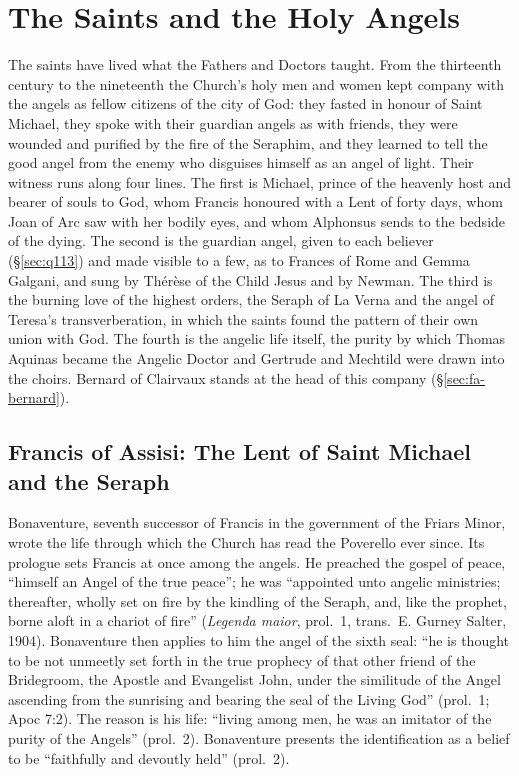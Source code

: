\section{The Saints and the Holy Angels}\label{sec:saints}

The saints have lived what the Fathers and Doctors taught. From the
thirteenth century to the nineteenth the Church's holy men and women kept
company with the angels as fellow citizens of the city of God: they fasted
in honour of Saint Michael, they spoke with their guardian angels as with
friends, they were wounded and purified by the fire of the Seraphim, and
they learned to tell the good angel from the enemy who disguises himself as
an angel of light. Their witness runs along four lines. The first is
Michael, prince of the heavenly host and bearer of souls to God, whom
Francis honoured with a Lent of forty days, whom Joan of Arc saw with her
bodily eyes, and whom Alphonsus sends to the bedside of the dying. The
second is the guardian angel, given to each believer
(\S\ref{sec:q113}) and made visible to a few, as to Frances of Rome and Gemma Galgani, and sung by Thérèse of the
Child Jesus and by Newman. The third is the burning love of the highest
orders, the Seraph of La Verna and the angel of Teresa's transverberation,
in which the saints found the pattern of their own union with God. The
fourth is the angelic life itself, the purity by which Thomas Aquinas became
the Angelic Doctor and Gertrude and Mechtild were drawn into the choirs.
Bernard of Clairvaux stands at the head of this company
(\S\ref{sec:fa-bernard}).

\sectionguard\subsection{Francis of Assisi: The Lent of Saint Michael and
the Seraph}\label{sec:sa-francis}

Bonaventure, seventh successor of Francis in the government of the Friars
Minor, wrote the life through which the Church has read the Poverello ever
since. Its prologue sets Francis at once among the angels. He preached
the gospel of peace, ``himself an Angel of the true peace''; he was
``appointed unto angelic ministries; thereafter, wholly set on fire by the
kindling of the Seraph, and, like the prophet, borne aloft in a chariot of
fire'' (\emph{Legenda maior}, prol.~1, trans.\ E. Gurney Salter, 1904).
Bonaventure then applies to him the angel of the sixth seal: ``he is
thought to be not unmeetly set forth in the true prophecy of that other
friend of the Bridegroom, the Apostle and Evangelist John, under the
similitude of the Angel ascending from the sunrising and bearing the seal of
the Living God'' (prol.~1; Apoc 7:2). The reason is his life: ``living among
men, he was an imitator of the purity of the Angels'' (prol.~2).
Bonaventure presents the identification as a belief to be ``faithfully and
devoutly held'' (prol.~2).

